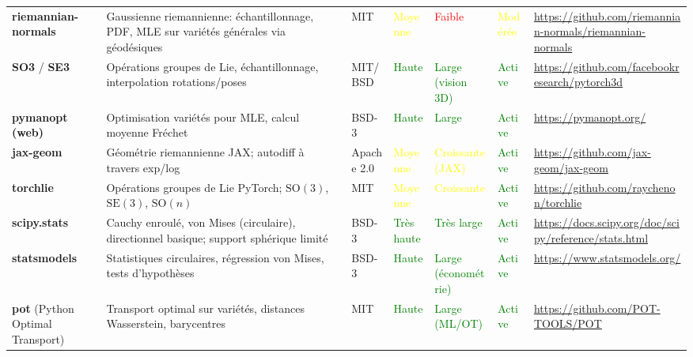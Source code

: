 \documentclass[11pt,a4paper]{article}
\begin{document}
\begin{longtable}{@{}p{2.3cm}p{3.8cm}p{1.5cm}p{1.5cm}p{1.5cm}p{1.5cm}p{2.5cm}@{}}
\textbf{riemannian-normals} & Gaussienne riemannienne: échantillonnage, PDF, MLE sur variétés générales via géodésiques & MIT & \textcolor{yellow}{Moyenne} & \textcolor{red}{Faible} & \textcolor{yellow}{Modérée} & \url{https://github.com/riemannian-normals/riemannian-normals} \\
\textbf{SO3} / \textbf{SE3} & Opérations groupes de Lie, échantillonnage, interpolation rotations/poses & MIT/BSD & \textcolor{green}{Haute} & \textcolor{green}{Large (vision 3D)} & \textcolor{green}{Active} & \url{https://github.com/facebookresearch/pytorch3d} \\
\textbf{pymanopt (web)} & Optimisation variétés pour MLE, calcul moyenne Fréchet & BSD-3 & \textcolor{green}{Haute} & \textcolor{green}{Large} & \textcolor{green}{Active} & \url{https://pymanopt.org/} \\
\textbf{jax-geom} & Géométrie riemannienne JAX; autodiff à travers exp/log & Apache 2.0 & \textcolor{yellow}{Moyenne} & \textcolor{yellow}{Croissante (JAX)} & \textcolor{green}{Active} & \url{https://github.com/jax-geom/jax-geom} \\
\textbf{torchlie} & Opérations groupes de Lie PyTorch; $\text{SO}(3)$, $\text{SE}(3)$, $\text{SO}(n)$ & MIT & \textcolor{yellow}{Moyenne} & \textcolor{yellow}{Croissante} & \textcolor{green}{Active} & \url{https://github.com/raychenon/torchlie} \\
\textbf{scipy.stats} & Cauchy enroulé, von Mises (circulaire), directionnel basique; support sphérique limité & BSD-3 & \textcolor{green}{Très haute} & \textcolor{green}{Très large} & \textcolor{green}{Active} & \url{https://docs.scipy.org/doc/scipy/reference/stats.html} \\
\textbf{statsmodels} & Statistiques circulaires, régression von Mises, tests d'hypothèses & BSD-3 & \textcolor{green}{Haute} & \textcolor{green}{Large (économétrie)} & \textcolor{green}{Active} & \url{https://www.statsmodels.org/} \\
\textbf{pot} (Python Optimal Transport) & Transport optimal sur variétés, distances Wasserstein, barycentres & MIT & \textcolor{green}{Haute} & \textcolor{green}{Large (ML/OT)} & \textcolor{green}{Active} & \url{https://github.com/POT-TOOLS/POT} \\
\bottomrule
\end{longtable}
\end{document}
